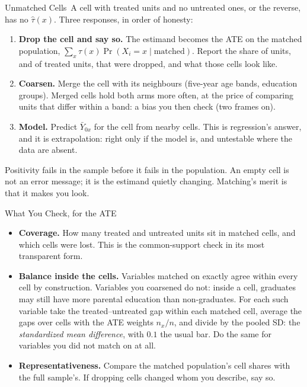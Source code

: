 \documentclass[aspectratio=169,11pt,xcolor=dvipsnames]{beamer}
\newcommand{\core}{\,\raisebox{0.6pt}{\textcolor{corestar}{$\bigstar$}}}
\begin{document}
\begin{frame}{Unmatched Cells\core}
A cell with treated units and no untreated ones, or the reverse, has no
$\hat\tau(x)$. Three responses, in order of honesty:
\begin{enumerate}\itemsep3pt
  \item \textbf{Drop the cell and say so.} The estimand becomes the ATE on the
        matched population, $\sum_x \tau(x)\Pr(X_i = x \mid \text{matched})$.
        Report the share of units, and of treated units, that were dropped, and
        what those cells look like.
  \item \textbf{Coarsen.} Merge the cell with its neighbours (five-year age
        bands, education groups). Merged cells hold both arms more often, at
        the price of comparing units that differ within a band: a bias you then
        check (two frames on).
  \item \textbf{Model.} Predict $\bar Y_{0x}$ for the cell from nearby cells.
        This is regression's answer, and it is extrapolation: right only if the
        model is, and untestable where the data are absent.
\end{enumerate}
\vskip3pt
\alert{Positivity fails in the sample before it fails in the population.} An
empty cell is not an error message; it is the estimand quietly changing.
Matching's merit is that it makes you look.
\end{frame}

\begin{frame}{What You Check, for the ATE\core}
\begin{itemize}\itemsep3pt
  \item \textbf{Coverage.} How many treated and untreated units sit in matched
        cells, and which cells were lost. This is the common-support check in
        its most transparent form.
  \item \textbf{Balance inside the cells.} Variables matched on exactly agree
        within every cell by construction. Variables you coarsened do not:
        inside a cell, graduates may still have more parental education than
        non-graduates. For each such variable take the treated--untreated gap
        within each matched cell, average the gaps over cells with the ATE
        weights $n_x/n$, and divide by the pooled SD: the \emph{standardized
        mean difference}, with $0.1$ the usual bar. Do the same for variables
        you did not match on at all.
  \item \textbf{Representativeness.} Compare the matched population's cell
        shares with the full sample's. If dropping cells changed whom you
        describe, say so.
\end{itemize}
\end{frame}
\end{document}
